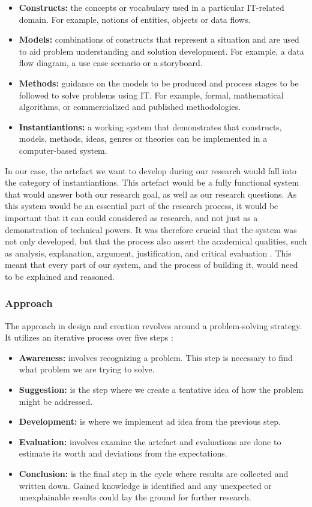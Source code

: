 \begin{itemize}
    \item\textbf{Constructs:} the concepts or vocabulary used in a particular IT-related domain. For example, notions of entities, objects or data flows.
    \item\textbf{Models:} combinations of constructs that represent a situation and are used to aid problem understanding and solution development. For example, a data flow diagram, a use case scenario or a storyboard.
    \item\textbf{Methods:} guidance on the models to be produced and process stages to be followed to solve problems using IT. For example, formal, mathematical algorithms, or commercialized and published methodologies.
    \item\textbf{Instantiantions:} a working system that demonstrates that constructs, models, methods, ideas, genres or theories can be implemented in a computer-based system.
\end{itemize}

In our case, the artefact we want to develop during our research would fall into the category of instantiantions. This artefact would be a fully functional system that would answer both our research goal, as well as our research questions.  As this system would be an essential part of the research process, it would be important that it can could considered as research, and not just as a demonstration of technical powers. It was therefore crucial that the system was not only developed, but that the process also assert the academical qualities, such as analysis, explanation, argument, justification, and critical evaluation \citep{oates2005researching}. This meant that every part of our system, and the process of building it, would need to be explained and reasoned.

\subsubsection{Approach}
\label{methodology-design-and-creation-approach}
The approach in design and creation revolves around a problem-solving strategy. It utilizes an iterative process over five steps \citep{vaishnavi2004design, oates2005researching}:

\begin{itemize}
    \item\textbf{Awareness:} involves recognizing a problem. This step is necessary to find what problem we are trying to solve.
    \item\textbf{Suggestion:} is the step where we create a tentative idea of how the problem might be addressed.
    \item\textbf{Development:} is where we implement ad idea from the previous step.
    \item\textbf{Evaluation:} involves examine the artefact and evaluations are done to estimate its worth and deviations from the expectations.
    \item\textbf{Conclusion:} is the final step in the cycle where results are collected and written down. Gained knowledge is identified and any unexpected or unexplainable results could lay the ground for further research.
\end{itemize}

